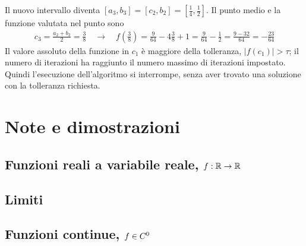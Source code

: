 \documentclass[letterpaper,10pt,italian]{jupyterBook}
\begin{document}
\sphinxAtStartPar
{} Il nuovo intervallo diventa \([a_3, b_3] = [c_2, b_2] = \left[\frac{1}{4}, \frac{1}{2}\right]\). Il punto medio e la funzione valutata nel punto sono
\begin{equation*}
\begin{split}c_3 = \frac{a_2 + b_2}{2} = \frac{3}{8} \quad \rightarrow \quad f\left(\frac{3}{8}\right) = \frac{9}{64} - 4 \frac{3}{8} + 1 = \frac{9}{64} - \frac{1}{2} = \frac{9 - 32}{64} = - \frac{23}{64} \end{split}
\end{equation*}
\sphinxAtStartPar
Il valore assoluto della funzione in \(c_1\) è maggiore della tolleranza, \(|f(c_1)| > \tau\); il numero di iterazioni ha raggiunto il numero massimo di iterazioni impostato. Quindi l’esecuzione dell’algoritmo si interrompe, senza aver trovato una soluzione con la tolleranza richiesta.





\sphinxstepscope


\section{Note e dimostrazioni}
\label{\detokenize{ch/infinitesimal_calculus/analysis-notes:note-e-dimostrazioni}}\label{\detokenize{ch/infinitesimal_calculus/analysis-notes:infinitesimal-calculus-analysis-notes}}\label{\detokenize{ch/infinitesimal_calculus/analysis-notes::doc}}

\subsection{Funzioni reali a variabile reale, \protect\(f: \mathbb{R} \rightarrow \mathbb{R}\protect\)}
\label{\detokenize{ch/infinitesimal_calculus/analysis-notes:funzioni-reali-a-variabile-reale-f-mathbb-r-rightarrow-mathbb-r}}

\subsection{Limiti}
\label{\detokenize{ch/infinitesimal_calculus/analysis-notes:limiti}}

\subsection{Funzioni continue, \protect\(f \in C^0\protect\)}
\label{\detokenize{ch/infinitesimal_calculus/analysis-notes:funzioni-continue-f-in-c-0}}
\end{document}
